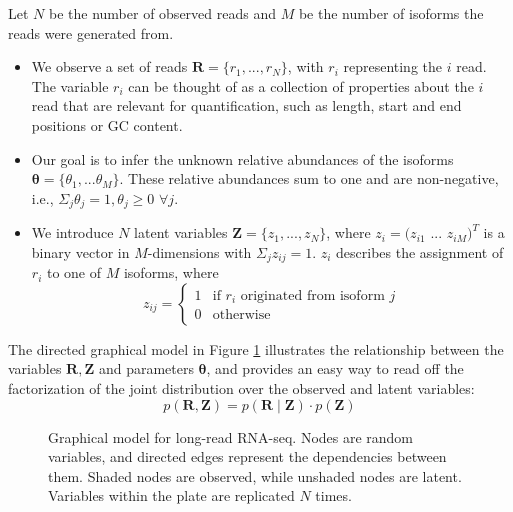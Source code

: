 Let $N$ be the number of observed reads and $M$ be the number of isoforms the reads were generated from. 
\begin{itemize}
    \item We observe a set of reads $\bm{R}=\{r_1,...,r_N\}$, with $r_i$ representing the $i$ read. The variable $r_i$ can be thought of as a collection of properties about the $i$ read that are relevant for quantification, such as length, start and end positions or GC content.
    \item Our goal is to infer the unknown relative abundances of the isoforms $\bm{\theta}=\{\theta_1,...\theta_M\}$. These relative abundances sum to one and are non-negative, i.e., $\Sigma_j\theta_j=1, \theta_j\geq0$ $\forall j$. 
    \item We introduce $N$ latent variables $\bm{Z}=\{z_1,...,z_N\}$, where $z_i=(z_{i1}$ $...$ $z_{iM})^T$ is a binary vector in $M$-dimensions with $\Sigma_jz_{ij}=1$. $z_i$ describes the assignment of $r_i$ to one of $M$ isoforms, where
    \begin{equation}
        z_{ij} = 
        \begin{cases}
        1 & \text{if } r_i \text{ originated from isoform } j\\
        0 & \text{otherwise }
        \end{cases}
    \end{equation}
\end{itemize} 
The directed graphical model in Figure \ref{fig:graphical-model-1} illustrates the relationship between the variables $\bm{R}, \bm{Z}$ and parameters $\bm{\theta}$, and provides an easy way to read off the factorization of the joint distribution over the observed and latent variables:
\begin{equation}
    p(\bm{R},\bm{Z})=p(\bm{R}\mid\bm{Z})\cdot p(\bm{Z})\label{eq:joint-dist}
\end{equation}
\begin{figure}[H]
    \centering
    \caption[Graphical model for long-read RNA-seq]{Graphical model for long-read RNA-seq. Nodes are random variables, and directed edges represent the dependencies between them. Shaded nodes are observed, while unshaded nodes are latent. Variables within the plate are replicated $N$ times.}
    \label{fig:graphical-model-1}
\end{figure}

